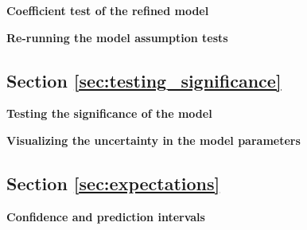 \begin{exercise}
\label{ex:t_test}

\textbf{Coefficient test of the refined model}



\end{exercise}

\begin{exercise}
\label{ex:Re_running_the_model_assumption_tests}

\textbf{Re-running the model assumption tests}



\end{exercise}

\subsection{Section \ref{sec:testing_significance}}

\begin{exercise}
\label{ex:f_test}

\textbf{Testing the significance of the model}



\end{exercise}

\begin{exercise}
\label{ex:confidence_bounds}

\textbf{Visualizing the uncertainty in the model parameters}






\end{exercise}

\subsection{Section \ref{sec:expectations}}

\begin{exercise}
\label{ex:Confidence_and_prediction_intervals}

\textbf{Confidence and prediction intervals}



\end{exercise}


